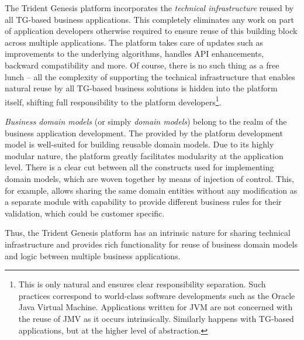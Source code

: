   The Trident Genesis platform incorporates the \emph{technical infrastructure} reused by all TG-based business applications.
  This completely eliminates any work on part of application developers otherwise required to ensure reuse of this building block across multiple applications.
  The platform takes care of updates such as improvements to the underlying algorithms, handles API enhancements, backward compatibility and more.
  Of course, there is no such thing as a free lunch -- all the complexity of supporting the technical infrastructure that enables natural reuse by all TG-based business solutions is hidden into the platform itself, shifting full responsibility to the platform developers\footnote{This is only natural and ensures clear responsibility separation. Such practices correspond to world-class software developments such as the Oracle Java Virtual Machine. 
  Applications written for JVM are not concerned with the reuse of JMV as it occurs intrinsically. Similarly happens with TG-based applications, but at the higher level of abstraction.}.

  \emph{Business domain models} (or simply \emph{domain models}) belong to the realm of the business application development.
  The provided by the platform development model is well-suited for building reusable domain models.
  Due to its highly modular nature, the platform greatly facilitates modularity at the application level.
  There is a clear cut between all the constructs used for implementing domain models, which are woven together by means of injection of control.
  This, for example, allows sharing the same domain entities without any modification as a separate module with capability to provide different business rules for their validation, which could be customer specific.

  Thus, the Trident Genesis platform has an intrinsic nature for sharing technical infrastructure and provides rich functionality for reuse of business domain models and logic between multiple business applications.